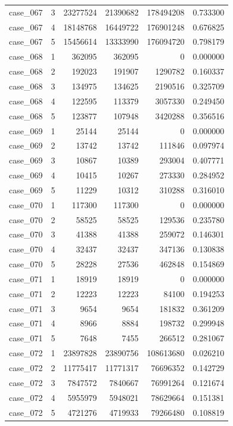 \begin{longtable}{lrrrrr}
case\_067 & 3 & 23277524 & 21390682 & 178494208 & 0.733300 \\
case\_067 & 4 & 18148768 & 16449722 & 176901248 & 0.676825 \\
case\_067 & 5 & 15456614 & 13333990 & 176094720 & 0.798179 \\
case\_068 & 1 & 362095 & 362095 & 0 & 0.000000 \\
case\_068 & 2 & 192023 & 191907 & 1290782 & 0.160337 \\
case\_068 & 3 & 134975 & 134625 & 2190516 & 0.325709 \\
case\_068 & 4 & 122595 & 113379 & 3057330 & 0.249450 \\
case\_068 & 5 & 123877 & 107948 & 3420288 & 0.356516 \\
case\_069 & 1 & 25144 & 25144 & 0 & 0.000000 \\
case\_069 & 2 & 13742 & 13742 & 111846 & 0.097974 \\
case\_069 & 3 & 10867 & 10389 & 293004 & 0.407771 \\
case\_069 & 4 & 10415 & 10267 & 273330 & 0.284952 \\
case\_069 & 5 & 11229 & 10312 & 310288 & 0.316010 \\
case\_070 & 1 & 117300 & 117300 & 0 & 0.000000 \\
case\_070 & 2 & 58525 & 58525 & 129536 & 0.235780 \\
case\_070 & 3 & 41388 & 41388 & 259072 & 0.146301 \\
case\_070 & 4 & 32437 & 32437 & 347136 & 0.130838 \\
case\_070 & 5 & 28228 & 27536 & 462848 & 0.154869 \\
case\_071 & 1 & 18919 & 18919 & 0 & 0.000000 \\
case\_071 & 2 & 12223 & 12223 & 84100 & 0.194253 \\
case\_071 & 3 & 9654 & 9654 & 181832 & 0.361209 \\
case\_071 & 4 & 8966 & 8884 & 198732 & 0.299948 \\
case\_071 & 5 & 7648 & 7455 & 266512 & 0.281067 \\
case\_072 & 1 & 23897828 & 23890756 & 108613680 & 0.026210 \\
case\_072 & 2 & 11775417 & 11771317 & 76696352 & 0.142729 \\
case\_072 & 3 & 7847572 & 7840667 & 76991264 & 0.121674 \\
case\_072 & 4 & 5955979 & 5948021 & 78629664 & 0.151381 \\
case\_072 & 5 & 4721276 & 4719933 & 79266480 & 0.108819 \\

\end{longtable}
